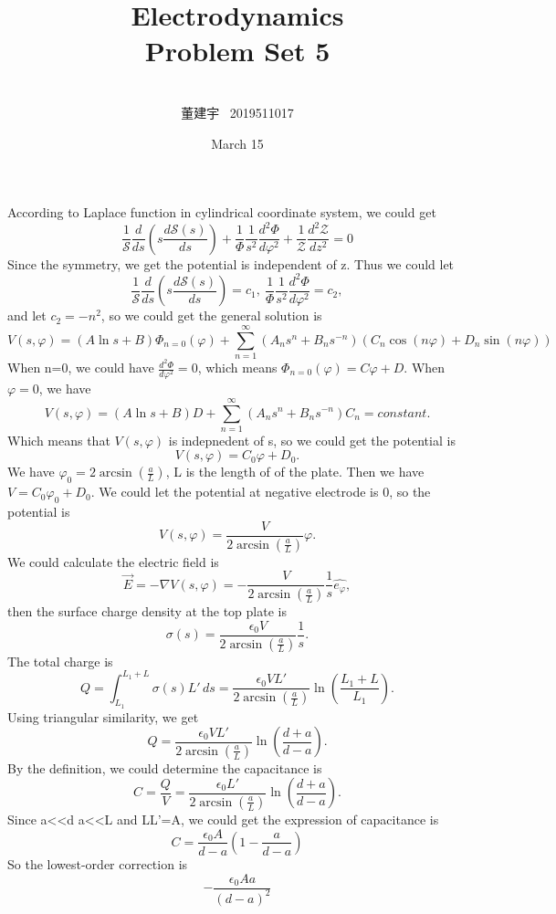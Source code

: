 \documentclass[10.5pt]{article}
\title{Electrodynamics \\Problem Set 5\\}
\author{\\董建宇 ~2019511017}
\date{March 15}
\begin{document}
    
\maketitle
\newpage

\section{}
According to Laplace function in cylindrical coordinate system, we could get $$\frac{1}{\mathcal{S}} \frac{d}{ds}\left(s\frac{d\mathcal{S}(s)}{ds}\right) + \frac{1}{\Phi} \frac{1}{s^2} \frac{d^2 \Phi}{d\varphi^2} + \frac{1}{\mathcal{Z}} \frac{d^2\mathcal{Z}}{dz^2} = 0$$\indent
Since the symmetry, we get the potential is independent of z. Thus we could let $$\frac{1}{\mathcal{S}} \frac{d}{ds}\left(s\frac{d\mathcal{S}(s)}{ds}\right) = c_1, ~\frac{1}{\Phi} \frac{1}{s^2} \frac{d^2 \Phi}{d\varphi^2} = c_2,$$\indent
and let $c_2=-n^2$, so we could get the general solution is $$V(s,\varphi) = \left(A\ln s + B\right) \Phi_{n=0}(\varphi) + \sum_{n=1}^{\infty}\left(A_ns^n + B_ns^{-n}\right)\left(C_n\cos(n\varphi) + D_n\sin(n\varphi)\right)$$\indent
When n=0, we could have $\frac{d^2 \Phi}{d\varphi^2} = 0$, which means $\Phi_{n=0}(\varphi) = C\varphi + D$. When $\varphi=0$, we have $$V(s,\varphi) = \left(A\ln s + B\right)D + \sum_{n=1}^{\infty} \left(A_ns^n+B_ns^{-n}\right) C_n = constant.$$\indent 
Which means that $V(s,\varphi)$ is indepnedent of s, so we could get the potential is $$V(s,\varphi) = C_0 \varphi + D_0.$$\indent
We have $\varphi_0 = 2\arcsin\left(\frac{a}{L}\right)$, L is the length of of the plate. Then we have $V = C_0 \varphi_0 + D_0$. We could let the potential at negative electrode is 0, so the potential is $$V(s,\varphi)=\frac{V}{2\arcsin\left(\frac{a}{L}\right)}\varphi.$$\indent
We could calculate the electric field is $$\vec{E} = -\nabla V(s,\varphi) = -\frac{V}{2\arcsin\left(\frac{a}{L}\right)}\frac{1}{s} \hat{e_{\varphi}},$$\indent
then the surface charge density at the top plate is $$\sigma(s) = \frac{\epsilon_0V}{2\arcsin\left(\frac{a}{L}\right)} \frac{1}{s}.$$\indent
The total charge is $$Q = \int_{L_1}^{L_1+L} \sigma(s)L' \,ds = \frac{\epsilon_0VL'}{2\arcsin\left(\frac{a}{L}\right)} \ln\left(\frac{L_1+L}{L_1}\right).$$\indent
Using triangular similarity, we get $$Q=\frac{\epsilon_0VL'}{2\arcsin\left(\frac{a}{L}\right)}\ln\left(\frac{d+a}{d-a}\right).$$\indent
By the definition, we could determine the capacitance is $$C = \frac{Q}{V} = \frac{\epsilon_0L'}{2\arcsin\left(\frac{a}{L}\right)}\ln\left(\frac{d+a}{d-a}\right).$$\indent
Since a<<d a<<L and LL'=A, we could get the expression of capacitance is $$C = \frac{\epsilon_0A}{d-a} \left(1-\frac{a}{d-a}\right)$$\indent
So the lowest-order correction is $$-\frac{\epsilon_0Aa}{(d-a)^2}$$
\end{document}
